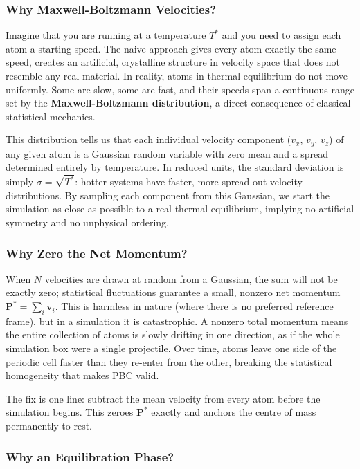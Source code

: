 \subsubsection{Why Maxwell-Boltzmann Velocities?}

Imagine that you are running at a temperature $T^*$ and you need to assign each atom a starting speed. The naive approach gives every atom exactly the same speed, creates an artificial, crystalline structure in velocity space that does not resemble any real material. In reality, atoms in thermal equilibrium do not move uniformly. Some are slow, some are fast, and their speeds span a continuous range set by the \textbf{Maxwell-Boltzmann distribution}, a direct consequence of classical statistical mechanics.

This distribution tells us that each individual velocity component ($v_x$, $v_y$, $v_z$) of any given atom is a Gaussian random variable with zero mean and a spread determined entirely by temperature. In reduced units, the standard deviation is simply $\sigma = \sqrt{T^*}$: hotter systems have faster, more spread-out velocity distributions. By sampling each component from this Gaussian, we start the simulation as close as possible to a real thermal equilibrium, implying no artificial symmetry and no unphysical ordering.

\subsubsection{Why Zero the Net Momentum?}
\label{sec_Zero_net_momentum}

When $N$ velocities are drawn at random from a Gaussian, the sum will not be exactly zero; statistical fluctuations guarantee a small, nonzero net momentum $\mathbf{P}^* = \sum_i \mathbf{v}_i$. This is harmless in nature (where there is no preferred reference frame), but in a simulation it is catastrophic. A nonzero total momentum means the entire collection of atoms is slowly drifting in one direction, as if the whole simulation box were a single projectile. Over time, atoms leave one side of the periodic cell faster than they re-enter from the other, breaking the statistical homogeneity that makes PBC valid.

The fix is one line: subtract the mean velocity from every atom before the simulation begins. This zeroes $\mathbf{P}^*$ exactly and anchors the centre of mass permanently to rest.

\subsubsection{Why an Equilibration Phase?}

